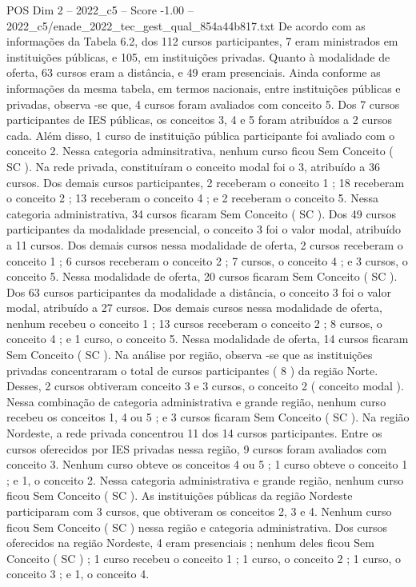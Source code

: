 \begin{textsample}{POS Dim 2 – 2022\_c5 – Score -1.00 – 2022\_c5/enade\_2022\_tec\_gest\_qual\_854a44b817.txt}
De acordo com as informações da Tabela 6.2, dos 112 cursos participantes, 7 eram ministrados em instituições públicas, e 105, em instituições privadas.
Quanto à modalidade de oferta, 63 cursos eram a distância, e 49 eram presenciais.
Ainda conforme as informações da mesma tabela, em termos nacionais, entre instituições públicas e privadas, observa -se que, 4 cursos foram avaliados com conceito 5.
Dos 7 cursos participantes de IES públicas, os conceitos 3, 4 e 5 foram atribuídos a 2 cursos cada.
Além disso, 1 curso de instituição pública participante foi avaliado com o conceito 2.
Nessa categoria adminsitrativa, nenhum curso ficou Sem Conceito ( SC ).
Na rede privada, constituíram o conceito modal foi o 3, atribuído a 36 cursos.
Dos demais cursos participantes, 2 receberam o conceito 1 ; 18 receberam o conceito 2 ; 13 receberam o conceito 4 ; e 2 receberam o conceito 5.
Nessa categoria administrativa, 34 cursos ficaram Sem Conceito ( SC ).
Dos 49 cursos participantes da modalidade presencial, o conceito 3 foi o valor modal, atribuído a 11 cursos.
Dos demais cursos nessa modalidade de oferta, 2 cursos receberam o conceito 1 ; 6 cursos receberam o conceito 2 ; 7 cursos, o conceito 4 ; e 3 cursos, o conceito 5.
Nessa modalidade de oferta, 20 cursos ficaram Sem Conceito ( SC ).
Dos 63 cursos participantes da modalidade a distância, o conceito 3 foi o valor modal, atribuído a 27 cursos.
Dos demais cursos nessa modalidade de oferta, nenhum recebeu o conceito 1 ; 13 cursos receberam o conceito 2 ; 8 cursos, o conceito 4 ; e 1 curso, o conceito 5.
Nessa modalidade de oferta, 14 cursos ficaram Sem Conceito ( SC ).
Na análise por região, observa -se que as instituições privadas concentraram o total de cursos participantes ( 8 ) da região Norte.
Desses, 2 cursos obtiveram conceito 3 e 3 cursos, o conceito 2 ( conceito modal ).
Nessa combinação de categoria administrativa e grande região, nenhum curso recebeu os conceitos 1, 4 ou 5 ; e 3 cursos ficaram Sem Conceito ( SC ).
Na região Nordeste, a rede privada concentrou 11 dos 14 cursos participantes.
Entre os cursos oferecidos por IES privadas nessa região, 9 cursos foram avaliados com conceito 3.
Nenhum curso obteve os conceitos 4 ou 5 ; 1 curso obteve o conceito 1 ; e 1, o conceito 2.
Nessa categoria administrativa e grande região, nenhum curso ficou Sem Conceito ( SC ).
As instituições públicas da região Nordeste participaram com 3 cursos, que obtiveram os conceitos 2, 3 e 4.
Nenhum curso ficou Sem Conceito ( SC ) nessa região e categoria administrativa.
Dos cursos oferecidos na região Nordeste, 4 eram presenciais ; nenhum deles ficou Sem Conceito ( SC ) ; 1 curso recebeu o conceito 1 ; 1 curso, o conceito 2 ; 1 curso, o conceito 3 ; e 1, o conceito 4.

\end{textsample}
